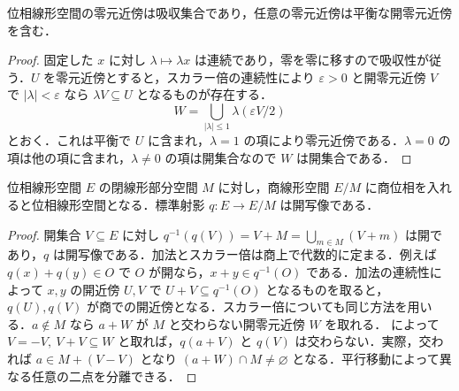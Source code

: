 \begin{prop}[平衡近傍の存在]
位相線形空間の零元近傍は吸収集合であり，任意の零元近傍は平衡な開零元近傍を含む．
\end{prop}
\begin{proof}
固定した $x$ に対し $\lambda\mapsto\lambda x$ は連続であり，零を零に移すので吸収性が従う．$U$ を零元近傍とすると，スカラー倍の連続性により $\varepsilon>0$ と開零元近傍 $V$ で $|\lambda|<\varepsilon$ なら $\lambda V\subseteq U$ となるものが存在する．
\[
W=\bigcup_{|\lambda|\leq1}\lambda(\varepsilon V/2)
\]
とおく．これは平衡で $U$ に含まれ，$\lambda=1$ の項により零元近傍である．$\lambda=0$ の項は他の項に含まれ，$\lambda\ne0$ の項は開集合なので $W$ は開集合である．
\end{proof}
\begin{prop}[閉部分空間による商位相線形空間]
位相線形空間 $E$ の閉線形部分空間 $M$ に対し，商線形空間 $E/M$ に商位相を入れると位相線形空間となる．標準射影 $q:E\to E/M$ は開写像である．
\end{prop}
\begin{proof}
開集合 $V\subseteq E$ に対し $q^{-1}(q(V))=V+M=\bigcup_{m\in M}(V+m)$ は開であり，$q$ は開写像である．加法とスカラー倍は商上で代数的に定まる．例えば $q(x)+q(y)\in O$ で $O$ が開なら，$x+y\in q^{-1}(O)$ である．加法の連続性によって $x,y$ の開近傍 $U,V$ で $U+V\subseteq q^{-1}(O)$ となるものを取ると，$q(U),q(V)$ が商での開近傍となる．スカラー倍についても同じ方法を用いる．$a\notin M$ なら $a+W$ が $M$ と交わらない開零元近傍 $W$ を取れる． によって $V=-V,\ V+V\subseteq W$ と取れば，$q(a+V)$ と $q(V)$ は交わらない．実際，交われば $a\in M+(V-V)$ となり $(a+W)\cap M\ne\varnothing$ となる．平行移動によって異なる任意の二点を分離できる．
\end{proof}
